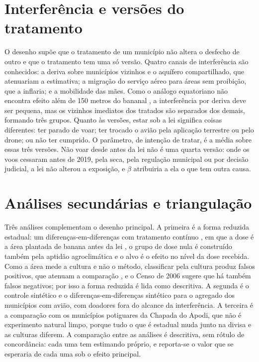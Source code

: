 \section{Interferência e versões do tratamento}

O desenho supõe que o tratamento de um município não altera o desfecho de
outro e que o tratamento tem uma só versão. Quatro canais de interferência
são conhecidos: a deriva sobre municípios vizinhos e o aquífero compartilhado,
que atenuariam a estimativa; a migração do serviço aéreo para áreas sem
proibição, que a inflaria; e a mobilidade das mães. Como o análogo equatoriano não encontra efeito além de 150 metros do
bananal \cite{calzada2023bananas}, a interferência por deriva deve ser
pequena, mas os vizinhos imediatos dos tratados são separados dos demais,
formando três grupos. Quanto às versões, estar sob a lei significa coisas
diferentes: ter parado de voar; ter trocado o avião pela aplicação terrestre
ou pelo drone; ou não ter cumprido. O parâmetro, de intenção de tratar, é a
média sobre essas três versões. Não voar desde antes da lei não é uma quarta
versão: onde os voos cessaram antes de 2019, pela seca, pela regulação
municipal ou por decisão judicial, a lei não alterou a exposição, e $\beta$
atribuiria a ela o que tem outra causa.

\section{Análises secundárias e triangulação}
\label{sec:secundarias}

Três análises complementam o desenho principal. A primeira é a forma reduzida
estadual: um diferenças-em-diferenças com tratamento contínuo
\cite{callaway2024continuous}, em que a dose é a área plantada de banana antes
da lei \cite{ibgepam}, o grupo de dose nula é construído também pela aptidão
agroclimática e o alvo é o efeito no nível da dose recebida. Como a área mede
a cultura e não o método, classificar pela cultura produz falsos positivos, que
atenuam a comparação \cite{denteh2022misclassification}, e o Censo de 2006
sugere que há também falsos negativos; por isso a forma reduzida é lida como
descritiva. A segunda é o controle sintético e o
diferenças-em-diferenças sintético \cite{arkhangelsky2021sdid} para o agregado
dos municípios com avião, com doadores fora do alcance da interferência. A
terceira é a comparação com os municípios potiguares da Chapada do Apodi, que
não é experimento natural limpo, porque tudo o que é estadual muda junto na
divisa e as culturas diferem. A comparação entre as análises é descritiva, sem
rótulo de concordância: cada uma tem estimando próprio, e reporta-se o valor
que se esperaria de cada uma sob o efeito principal.

